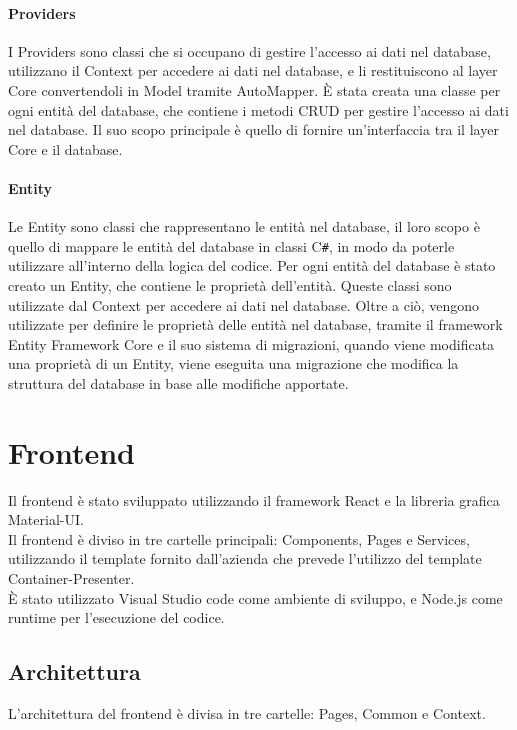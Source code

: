 \paragraph{Providers}
I Providers sono classi che si occupano di gestire l'accesso ai dati nel database, utilizzano il Context per accedere ai dati nel database, e li restituiscono al layer Core convertendoli in Model tramite AutoMapper. È stata creata una classe per ogni entità del database, che contiene i metodi CRUD per gestire l'accesso ai dati nel database. Il suo scopo principale è quello di fornire un'interfaccia tra il layer Core e il database.\\

\paragraph{Entity}
Le Entity sono classi che rappresentano le entità nel database, il loro scopo è quello di mappare le entità del database in classi C\texttt{\#}, in modo da poterle utilizzare all'interno della logica del codice. Per ogni entità del database è stato creato un Entity, che contiene le proprietà dell'entità. Queste classi sono utilizzate dal Context per accedere ai dati nel database. Oltre a ciò, vengono utilizzate per definire le proprietà delle entità nel database, tramite il framework Entity Framework Core e il suo sistema di migrazioni, quando viene modificata una proprietà di un Entity, viene eseguita una migrazione che modifica la struttura del database in base alle modifiche apportate.\\

\section{Frontend}
Il frontend è stato sviluppato utilizzando il framework React e la libreria grafica Material-UI.\\
Il frontend è diviso in tre cartelle principali: Components, Pages e Services, utilizzando il template fornito dall'azienda che prevede l'utilizzo del template Container-Presenter.\\
È stato utilizzato Visual Studio code come ambiente di sviluppo, e Node.js come runtime per l'esecuzione del codice.\\

\subsection{Architettura}
L'architettura del frontend è divisa in tre cartelle: Pages, Common e Context.

